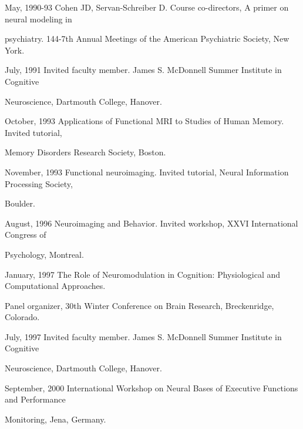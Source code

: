 \documentclass[10 pt]{article}
\begin{document}
May, 1990-93 \hspace{0.25in} Cohen JD, Servan-Schreiber D. Course co-directors, A primer on neural modeling in

\hspace{1.1in} psychiatry. 144-7th Annual Meetings of the American Psychiatric Society, New York.

July, 1991 \hspace{0.44in} Invited faculty member. James S. McDonnell Summer Institute in Cognitive

\hspace{1.1in} Neuroscience, Dartmouth College, Hanover.

October, 1993 \hspace{0.2in} Applications of Functional MRI to Studies of Human Memory. Invited tutorial,

\hspace{1.1in} Memory Disorders Research Society, Boston.

November, 1993 \hspace{0.09in} Functional neuroimaging. Invited tutorial, Neural Information Processing Society,

\hspace{1.1in} Boulder.

August, 1996 \hspace{0.25in} Neuroimaging and Behavior. Invited workshop, XXVI International Congress of

\hspace{1.1in} Psychology, Montreal.

January, 1997 \hspace{0.23in} The Role of Neuromodulation in Cognition: Physiological and Computational Approaches.

\hspace{1.1in} Panel organizer, 30th Winter Conference on Brain Research, Breckenridge, Colorado.

July, 1997 \hspace{0.44in} Invited faculty member. James S. McDonnell Summer Institute in Cognitive

\hspace{1.1in} Neuroscience, Dartmouth College, Hanover.

September, 2000 \hspace{0.05in} International Workshop on Neural Bases of Executive Functions and Performance

\hspace{1.1in} Monitoring, Jena, Germany.
\end{document}
